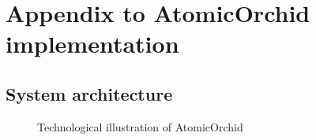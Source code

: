 \chapter{Appendix to AtomicOrchid implementation}


\section{System architecture}
\begin{figure}[H]
  \centering
  \caption{Technological illustration of AtomicOrchid}
  \label{fig:systemDescription}
\end{figure}

